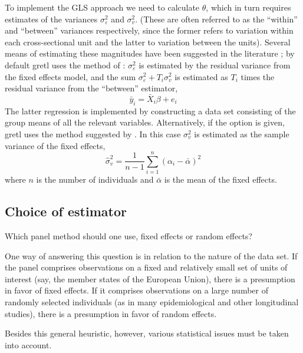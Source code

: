 To implement the GLS approach we need to calculate $\theta$, which in
turn requires estimates of the variances $\sigma^2_{\varepsilon}$ and
$\sigma^2_v$.  (These are often referred to as the ``within'' and
``between'' variances respectively, since the former refers to
variation within each cross-sectional unit and the latter to variation
between the units).  Several means of estimating these magnitudes have
been suggested in the literature \citep[see][]{baltagi95}; by default
gretl uses the method of \cite{swamy72}: $\sigma^2_\varepsilon$
is estimated by the residual variance from the fixed effects model,
and the sum $\sigma^2_\varepsilon + T_i \sigma^2_v$ is estimated as
$T_i$ times the residual variance from the ``between'' estimator,
\[
\bar{y}_i = \bar{X}_i \beta + e_i
\]
The latter regression is implemented by constructing a data set
consisting of the group means of all the relevant variables.
Alternatively, if the  option is given, gretl
uses the method suggested by \cite{nerlove71}. In this case
$\sigma^2_v$ is estimated as the sample variance of the fixed effects,
\[
\hat{\sigma}^2_v = \frac{1}{n-1} \sum_{i=1}^n 
  \left(\alpha_i - \bar{\alpha}\right)^2 
\]
where $n$ is the number of individuals and $\bar{\alpha}$ is the mean
of the fixed effects.

\subsection{Choice of estimator}
\label{panel-choice}

Which panel method should one use, fixed effects or random effects?

One way of answering this question is in relation to the nature of the
data set.  If the panel comprises observations on a fixed and
relatively small set of units of interest (say, the member states of
the European Union), there is a presumption in favor of fixed effects.
If it comprises observations on a large number of randomly selected
individuals (as in many epidemiological and other longitudinal
studies), there is a presumption in favor of random effects.

Besides this general heuristic, however, various statistical
issues must be taken into account.

